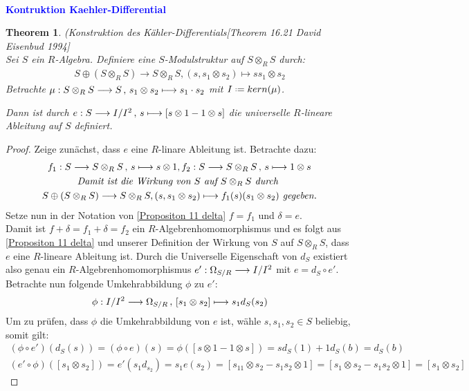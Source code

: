 \documentclass[10pt,a4paper]{report}
\newcommand{\comment}[1]{}
\newcommand{\ModulsOfDifferenzials}{David Eisenbud 1994}
\newcounter{Aussage}[chapter]
\newtheorem{theorem}[Aussage]{Theorem}
\newcommand{\functionfront}[3]{\nolinebreak{#1:#2 \longrightarrow #3}}
\newcommand{\function}[5]{\nolinebreak{#1:#2 \longrightarrow #3 \, , \, #4 \longmapsto #5}}
\newcommand{\divR}[2]{\Omega_{#1/#2}}
\newcommand{\divf}[1]{d_{#1}}
\newcommand{\Tensor}[3]{#1 \otimes_{#2} #3}
\newcommand{\tensor}[3]{#1 \otimes #3}
\newcommand*{\defeq}{\mathrel{\vcenter{\baselineskip0.5ex \lineskiplimit0pt
                     \hbox{\scriptsize.}\hbox{\scriptsize.}}}%
                     =}
\newcommand{\kernel}[1]{kern(#1)}
\begin{document}
\ \\
\textcolor{blue}{\textbf{Kontruktion Kaehler-Differential}}
\begin{theorem} (Konstruktion des Kähler-Differentials\comment{\label{Kontruktion Kaehler-Differential}}\textit{[Theorem 16.21 \ModulsOfDifferenzials]} \\
Sei $S$ ein $R$-Algebra. Definiere eine $S$-Modulstruktur auf $\Tensor{S}{R}{S}$ durch:
\begin{gather*}
S \oplus (\Tensor{S}{R}{S}) \longrightarrow \Tensor{S}{R}{S} ,(s,\tensor{s_1}{R}{s_2}) \longmapsto \tensor{ss_1}{R}{s_2}
\end{gather*}
Betrachte $\function{\mu}{\Tensor{S}{R}{S}}{S}{\tensor{s_1}{R}{s_2}}{s_1 \cdot s_2}$ mit $I \defeq \kernel{\mu}$.\\
\begin{center}
Dann ist durch $\function{e}{S}{I/I^2}{s}{[\tensor{s}{R}{1} - \tensor{1}{R}{s}]}$ die universelle $R$-lineare Ableitung auf $S$ definiert.
\end{center}
\end{theorem}
\begin{proof}
Zeige zunächst, dass $e$ eine $R$-linare Ableitung ist. Betrachte dazu:
\begin{gather*}
\function{f_1}{S}{\Tensor{S}{R}{S}}{s}{\tensor{s}{R}{1}} , \function{f_2}{S}{\Tensor{S}{R}{S}}{s}{\tensor{1}{R}{s}} \\
\textit{Damit ist die Wirkung von $S$ auf $\Tensor{S}{R}{S}$ durch }\\ S \oplus (\Tensor{S}{R}{S}) \longrightarrow \Tensor{S}{R}{S} ,(s,\tensor{s_1}{R}{s_2}) \longmapsto f_1(s)(\tensor{s_1}{R}{s_2}) \textit{ gegeben.}
\end{gather*}
Setze nun in der Notation von \cref{Propositon 11 delta} $f = f_1$ und $\delta = e$.\\
Damit ist $f + \delta = f_1 + \delta = f_2$ ein $R$-Algebrenhomomorphismus und es folgt aus \cref{Propositon 11 delta} und unserer Definition der Wirkung von $S$ auf $\Tensor{S}{R}{S}$, dass $e$ eine $R$-lineare Ableitung ist. Durch die Universelle Eigenschaft von $\divf{S}$ existiert also genau ein $R$-Algebrenhomomorphismus $\functionfront{e'}{\divR{S}{R}}{I/I^2}$ mit $e = \divf{S} \circ e'$.\\
Betrachte nun folgende Umkehrabbildung $\phi$ zu $e'$:
\begin{gather*}
\function{\phi}{I/I^2}{\divR{S}{R}}{[\tensor{s_1}{R}{s_2}]}{s_1\divf{S}(s_2)}
\end{gather*}
Um zu prüfen, dass $\phi$ die Umkehrabbildung von $e$ ist, wähle $s,s_1,s_2 \in S$ beliebig, somit gilt:
\begin{gather*}
(\phi \circ e')(\divf{S}(s)) = (\phi \circ e)(s) = \phi([\tensor{s}{R}{1} - \tensor{1}{R}{s}]) = s\divf{S}(1) + 1\divf{S}(b) = \divf{S}(b) \\
(e' \circ \phi)([\tensor{s_1}{R}{s_2}]) = e'(s_1\divf{s_2}) = s_1 e(s_2) = [s_1\tensor{1}{R}{s_2} - s_1\tensor{s_2}{R}{1}] =
[\tensor{s_1}{R}{s_2} - \tensor{s_1s_2}{R}{1}] = [\tensor{s_1}{R}{s_2}]
\end{gather*}
\end{proof}
\end{document}
